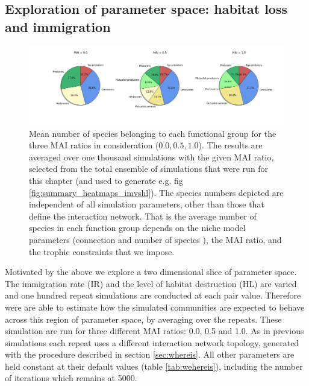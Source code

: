 \begin{itemize}
\newpage
\section{Exploration of parameter space: habitat loss and immigration}
\label{sec:heatmaps}

\begin{figure}
	\hspace{-2.5cm}
	\includegraphics[width=1.3\linewidth]{"./chapters/chapter04/figures/init_proportions"}
	\caption{Mean number of species belonging to each functional group for the three MAI ratios in consideration ($0.0,0.5,1.0$). The results are averaged over one thousand simulations with the given MAI ratio, selected from the total ensemble of simulations that were run for this chapter (and used to generate e.g. fig \ref{fig:summary_heatmaps_imvshl}). The species numbers depicted are independent of all simulation parameters, other than those that define the interaction network. That is the average number of species in each function group depends on the niche model parameters (connection and number of species ), the MAI ratio, and the trophic constraints that we impose. }
	\label{fig:initial_proportions}
\end{figure}


Motivated by the above we explore a two dimensional slice of parameter space. The immigration rate (IR) and the level of habitat destruction (HL) are varied and one hundred repeat simulations are conducted at each pair value. Therefore were are able to estimate how the simulated communities are expected to behave across this region of parameter space, by averaging over the repeats. These simulation are run for three different MAI ratios: 0.0, 0.5 and 1.0. As in previous simulations each repeat uses a different interaction network topology, generated with the procedure described in section \ref{sec:whereis}.  All other parameters are held constant at their default values (table \ref{tab:wehereis}), including the number of iterations which remains at 5000. 


\end{itemize}
